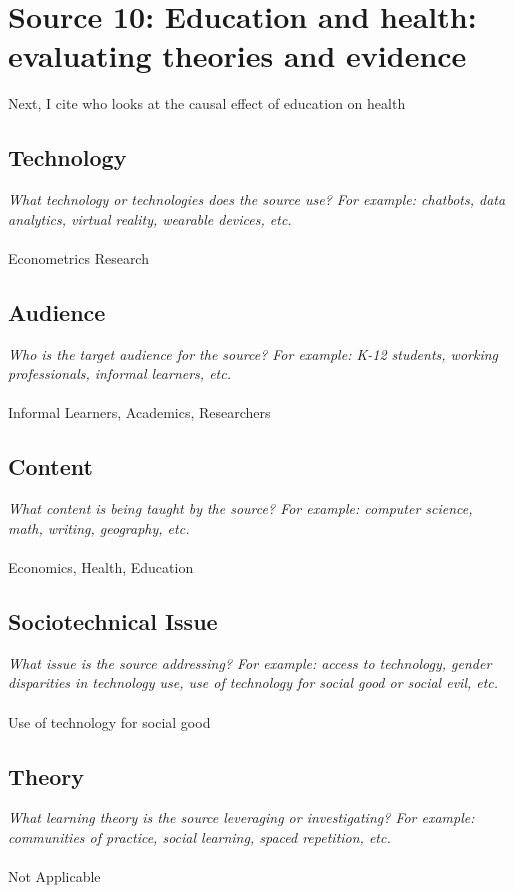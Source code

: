 \documentclass[12pt, final]{article}
\begin{document}
\section{Source 10: Education and health: evaluating theories and evidence}
\label{Source 10}

Next, I cite \cite{Cutler} who looks at the causal effect of education on health

\subsection{Technology}
\textit{What technology or technologies does the source use? For example: chatbots, data analytics, virtual reality, wearable devices, etc.}
\\
\\
Econometrics Research

\subsection{Audience}
\textit{Who is the target audience for the source? For example: K-12 students, working professionals, informal learners, etc.}
\\
\\
Informal Learners, Academics, Researchers

\subsection{Content}
\textit{What content is being taught by the source? For example: computer science, math, writing, geography, etc.}
\\
\\
Economics, Health, Education

\subsection{Sociotechnical Issue}
\textit{What issue is the source addressing? For example: access to technology, gender disparities in technology use, use of technology for social good or social evil, etc.}
\\
\\
Use of technology for social good

\subsection{Theory}
\textit{What learning theory is the source leveraging or investigating? For example: communities of practice, social learning, spaced repetition, etc.}
\\
\\
Not Applicable
\end{document}
